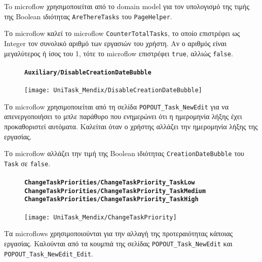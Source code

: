                 To microflow χρησιμοποιείται από το domain model για τον υπολογισμό της τιμής της Boolean ιδιότητας \texttt{AreThereTasks} του \texttt{PageHelper}.

                Το microflow καλεί το microflow \texttt{CounterTotalTasks}, το οποίο επιστρέφει ως Integer τον συνολικό αριθμό των εργασιών του χρήστη. Αν ο αριθμός είναι μεγαλύτερος ή ίσος του 1, τότε το microflow επιστρέφει \texttt{true}, αλλιώς \texttt{false}.

                \begin{figure}[H] \noindent
                    \paragraph{\texttt{Auxiliary/DisableCreationDateBubble}}
                    \begin{center}
                        \texttt{[image: UniTask\_Mendix/DisableCreationDateBubble]}
                    \end{center}
                \end{figure}

                Το microflow χρησιμοποιείται από τη σελίδα \texttt{POPOUT\_Task\_NewEdit} για να απενεργοποιήσει το μπλε παράθυρο που ενημερώνει ότι η ημερομηνία λήξης έχει προκαθοριστεί αυτόματα. Καλείται όταν ο χρήστης αλλάζει την ημερομηνία λήξης της εργασίας.

                Το microflow αλλάζει την τιμή της Boolean ιδιότητας \texttt{CreationDateBubble} του \texttt{Task} σε \texttt{false}.

                \begin{figure}[H] \noindent
                    \paragraph{\texttt{ChangeTaskPriorities/ChangeTaskPriority\_TaskLow} \\ \texttt{ChangeTaskPriorities/ChangeTaskPriority\_TaskMedium} \\ \texttt{ChangeTaskPriorities/ChangeTaskPriority\_TaskHigh}}
                    \begin{center}
                        \texttt{[image: UniTask\_Mendix/ChangeTaskPriority]}
                    \end{center}
                \end{figure}

                Τα microflows χρησιμοποιούνται για την αλλαγή της προτεραιότητας κάποιας εργασίας. Καλούνται από τα κουμπιά της σελίδας \texttt{POPOUT\_Task\_NewEdit} και \texttt{POPOUT\_Task\_NewEdit\_Edit}.

